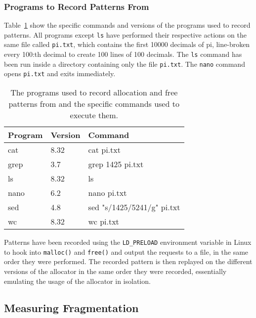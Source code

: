 \subsubsection{Programs to Record Patterns From}

Table~\ref{table:pattern-programs} show the specific commands and versions of the programs used to record patterns. All programs except \texttt{ls} have performed their respective actions on the same file called \texttt{pi.txt}, which contains the first 10000 decimals of pi, line-broken every 100:th decimal to create 100 lines of 100 decimals. The \texttt{ls} command has been run inside a directory containing only the file \texttt{pi.txt}. The \texttt{nano} command opens \texttt{pi.txt} and exits immediately.

\begin{table}[H]
\centering
\begin{tabular}{llp{10.4cm}}
\textbf{Program} & \textbf{Version} & \textbf{Command} \\ \hline
cat  & 8.32 & cat pi.txt\\ \hline
grep & 3.7  & grep 1425 pi.txt\\ \hline
ls   & 8.32 & ls \\ \hline
nano & 6.2  & nano pi.txt\\ \hline
sed  & 4.8  & sed "s/1425/5241/g" pi.txt\\ \hline
wc   & 8.32 & wc pi.txt\\ \hline
\end{tabular}
\caption{The programs used to record allocation and free patterns from and the specific commands used to execute them.}
\label{table:pattern-programs}
\end{table}

Patterns have been recorded using the \texttt{LD\_PRELOAD} environment variable in Linux to hook into \texttt{malloc()} and \texttt{free()} and output the requests to a file, in the same order they were performed. The recorded pattern is then replayed on the different versions of the allocator in the same order they were recorded, essentially emulating the usage of the allocator in isolation.

\subsection{Measuring Fragmentation}


